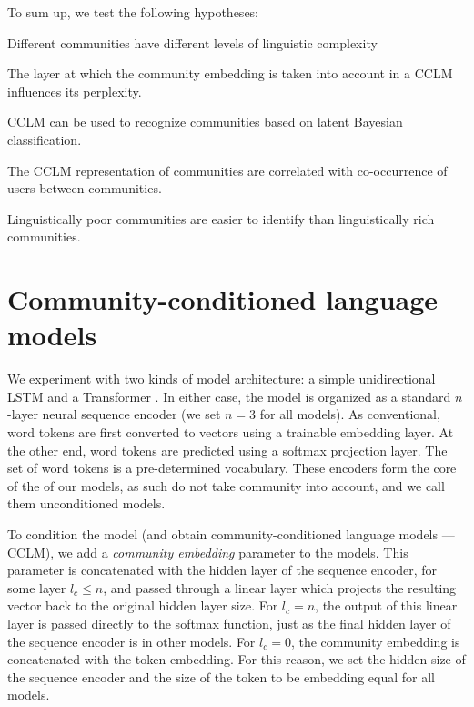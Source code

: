 \documentclass[11pt]{article}
\newcommand\jp[1]{\todo[backgroundcolor=blue!10]{JP: #1}}
\begin{document}
To sum up, we test the following hypotheses:
\begin{hypotheses}
\item \label{hyp:varying-complexity} Different communities have different levels of linguistic
  complexity
\item \label{hyp:layer-effect} The layer at which the community embedding is taken into account
  in a CCLM influences its perplexity.
\item \label{hyp:LMCC-works} CCLM can be used to recognize communities based on
  latent Bayesian classification.
\item \label{hyp:extra-linguistic-correlation} The CCLM representation of communities are correlated with
  co-occurrence of users between communities.
\item \label{hyp:rich-harder-to-identify} Linguistically poor communities are easier to identify than
  linguistically rich communities.
\end{hypotheses}


\section{Community-conditioned language models}

We experiment with two kinds of model architecture: a simple
unidirectional LSTM \citep{Hochreiter1997} and a Transformer
\citep{Vaswani2017}.  In either case, the model is organized as a
standard $n$-layer neural sequence encoder (we set $n=3$ for all
models). As conventional, word tokens are first converted to vectors
using a trainable embedding layer. At the other end, word tokens are
predicted using a softmax projection layer. The set of word tokens is
a pre-determined vocabulary.  These encoders form the core of the
of our models, as such do not take community into account, and we call them
unconditioned models.

To condition the model (and obtain community-conditioned language
models --- CCLM), we add a \emph{community embedding} parameter to the
models.  This parameter is concatenated with the hidden layer of the
sequence encoder, for some layer $l_c \leq n$, and passed through a
linear layer which projects the resulting vector back to the original
hidden layer size.  For $l_c = n$, the output of this linear layer is
passed directly to the softmax function, just as the final hidden
layer of the sequence encoder is in other models.  For $l_c=0$, the
community embedding is concatenated with the token embedding.  For
this reason, we set the hidden size of the sequence encoder and the
size of the token to be embedding equal for all models.
\end{document}

